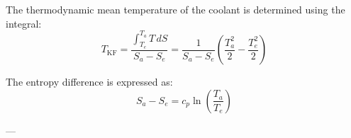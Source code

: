 The thermodynamic mean temperature of the coolant is determined using the integral:  
\[
T_{\text{KF}} = \frac{\int_{T_e}^{T_a} T \, dS}{S_a - S_e} = \frac{1}{S_a - S_e} \left( \frac{T_a^2}{2} - \frac{T_e^2}{2} \right)
\]  

The entropy difference is expressed as:  
\[
S_a - S_e = c_p \ln\left(\frac{T_a}{T_e}\right)
\]  

---